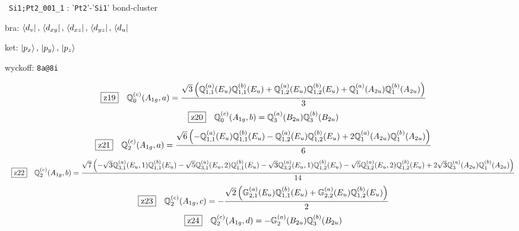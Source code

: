 \documentclass[fleqn,10pt,landscape]{jsarticle}
\begin{document}
\noindent\textbullet\, \texttt{Si1;Pt2_001_1} : '\texttt{Pt2}'-'\texttt{Si1}' bond-cluster

\noindent\quad * bra: $\bra{d_{v}},\, \bra{d_{xy}},\, \bra{d_{xz}},\, \bra{d_{yz}},\, \bra{d_{u}}$

\noindent\quad * ket: $\ket{p_{x}},\, \ket{p_{y}},\, \ket{p_{z}}$

\noindent\quad * wyckoff: \texttt{8a@8i}

\begin{dmath*}
\hspace*{3mm}\fbox{z19}\quad \mathbb{Q}_{0}^{(c)}(A_{1g},a)=\frac{\sqrt{3} \left(\mathbb{Q}_{1,1}^{(a)}(E_{u}) \mathbb{Q}_{1,1}^{(b)}(E_{u}) + \mathbb{Q}_{1,2}^{(a)}(E_{u}) \mathbb{Q}_{1,2}^{(b)}(E_{u}) + \mathbb{Q}_{1}^{(a)}(A_{2u}) \mathbb{Q}_{1}^{(b)}(A_{2u})\right)}{3}
\end{dmath*}
\begin{dmath*}
\hspace*{3mm}\fbox{z20}\quad \mathbb{Q}_{0}^{(c)}(A_{1g},b)=\mathbb{Q}_{3}^{(a)}(B_{2u}) \mathbb{Q}_{3}^{(b)}(B_{2u})
\end{dmath*}
\begin{dmath*}
\hspace*{3mm}\fbox{z21}\quad \mathbb{Q}_{2}^{(c)}(A_{1g},a)=\frac{\sqrt{6} \left(- \mathbb{Q}_{1,1}^{(a)}(E_{u}) \mathbb{Q}_{1,1}^{(b)}(E_{u}) - \mathbb{Q}_{1,2}^{(a)}(E_{u}) \mathbb{Q}_{1,2}^{(b)}(E_{u}) + 2 \mathbb{Q}_{1}^{(a)}(A_{2u}) \mathbb{Q}_{1}^{(b)}(A_{2u})\right)}{6}
\end{dmath*}
\begin{dmath*}
\hspace*{3mm}\fbox{z22}\quad \mathbb{Q}_{2}^{(c)}(A_{1g},b)=\frac{\sqrt{7} \left(- \sqrt{3} \mathbb{Q}_{3,1}^{(a)}(E_{u},1) \mathbb{Q}_{1,1}^{(b)}(E_{u}) - \sqrt{5} \mathbb{Q}_{3,1}^{(a)}(E_{u},2) \mathbb{Q}_{1,1}^{(b)}(E_{u}) - \sqrt{3} \mathbb{Q}_{3,2}^{(a)}(E_{u},1) \mathbb{Q}_{1,2}^{(b)}(E_{u}) - \sqrt{5} \mathbb{Q}_{3,2}^{(a)}(E_{u},2) \mathbb{Q}_{1,2}^{(b)}(E_{u}) + 2 \sqrt{3} \mathbb{Q}_{3}^{(a)}(A_{2u}) \mathbb{Q}_{1}^{(b)}(A_{2u})\right)}{14}
\end{dmath*}
\begin{dmath*}
\hspace*{3mm}\fbox{z23}\quad \mathbb{Q}_{2}^{(c)}(A_{1g},c)=- \frac{\sqrt{2} \left(\mathbb{G}_{2,1}^{(a)}(E_{u}) \mathbb{Q}_{1,1}^{(b)}(E_{u}) + \mathbb{G}_{2,2}^{(a)}(E_{u}) \mathbb{Q}_{1,2}^{(b)}(E_{u})\right)}{2}
\end{dmath*}
\begin{dmath*}
\hspace*{3mm}\fbox{z24}\quad \mathbb{Q}_{2}^{(c)}(A_{1g},d)=- \mathbb{G}_{2}^{(a)}(B_{2u}) \mathbb{Q}_{3}^{(b)}(B_{2u})
\end{dmath*}
\end{document}
